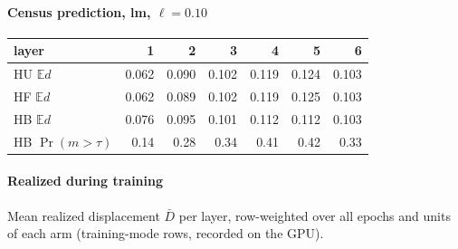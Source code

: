 \documentclass[11pt]{article}
\begin{document}
\paragraph{Census prediction, lm, $\ell=0.10$}
\begin{tabular}{lrrrrrr}\toprule layer & 1 & 2 & 3 & 4 & 5 & 6\\\midrule
HU $\mathbb{E}d$ & 0.062 & 0.090 & 0.102 & 0.119 & 0.124 & 0.103\\
HF $\mathbb{E}d$ & 0.062 & 0.089 & 0.102 & 0.119 & 0.125 & 0.103\\
HB $\mathbb{E}d$ & 0.076 & 0.095 & 0.101 & 0.112 & 0.112 & 0.103\\
HB $\Pr(m>\tau)$ & 0.14 & 0.28 & 0.34 & 0.41 & 0.42 & 0.33\\\bottomrule\end{tabular}
\paragraph{Realized during training} Mean realized displacement $\bar D$ per layer, row-weighted over all epochs and units of each arm (training-mode rows, recorded on the GPU).
\end{document}

